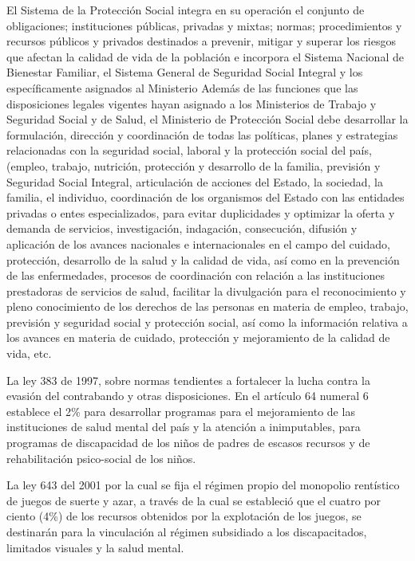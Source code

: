 \documentclass[a4paper, 12pt, oneside]{article}
\begin{document}
	El Sistema de la Protección Social integra en su operación el conjunto de obligaciones; instituciones públicas, privadas y mixtas; normas; procedimientos y recursos públicos y privados destinados a prevenir, mitigar y superar los riesgos que afectan la calidad de vida de la población e incorpora el Sistema Nacional de Bienestar Familiar, el Sistema General de Seguridad Social Integral y los específicamente asignados al Ministerio Además de las funciones que las disposiciones legales vigentes hayan asignado a los Ministerios de Trabajo y Seguridad Social y de Salud, el Ministerio de Protección Social debe desarrollar la formulación, dirección y coordinación de todas las políticas, planes y estrategias relacionadas con la seguridad social, laboral y la protección social del país, (empleo, trabajo, nutrición, protección y desarrollo de la familia, previsión y Seguridad Social Integral, articulación de acciones del Estado, la sociedad, la familia, el individuo, coordinación de los organismos del Estado con las entidades privadas o entes especializados, para evitar duplicidades y optimizar la oferta y demanda de servicios, investigación, indagación, consecución, difusión y aplicación de los avances nacionales e internacionales en el campo del cuidado, protección, desarrollo de la salud y la calidad de vida, así como en la prevención de las enfermedades, procesos de coordinación con relación a las instituciones prestadoras de servicios de salud, facilitar la divulgación para el reconocimiento y pleno conocimiento de los derechos de las personas en materia de empleo, trabajo, previsión y seguridad social y protección social, así como la información relativa a los avances en materia de cuidado, protección y mejoramiento de la calidad de vida, etc.

	La ley 383 de 1997, sobre normas tendientes a fortalecer la lucha contra la evasión del contrabando y otras disposiciones. En el artículo 64 numeral 6 establece el 2\% para desarrollar programas para el mejoramiento de las instituciones de salud mental del país y la atención a inimputables, para programas de discapacidad de los niños de padres de escasos recursos y de rehabilitación psico-social de los niños.

	La ley 643 del 2001 por la cual se fija el régimen propio del monopolio rentístico de juegos de suerte y azar, a través de la cual se estableció que el cuatro por ciento (4\%) de los recursos obtenidos por la explotación de los juegos, se destinarán para la vinculación al régimen subsidiado a los discapacitados, limitados visuales y la salud mental. 
\end{document}
